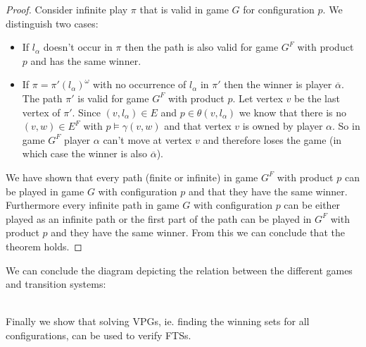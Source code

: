 \begin{theorem}
\begin{proof}
		Consider infinite play $\pi$ that is valid in game $G$ for configuration $p$. We distinguish two cases:
		\begin{itemize}
			\item If $l_\alpha$ doesn't occur in $\pi$ then the path is also valid for game $G^F$ with product $p$ and has the same winner.
			\item If $\pi = \pi'(l_\alpha)^\omega$ with no occurrence of $l_\alpha$ in $\pi'$ then the winner is player $\overline{\alpha}$. The path $\pi'$ is valid for game $G^F$ with product $p$. Let vertex $v$ be the last vertex of $\pi'$. Since $(v, l_\alpha) \in E$ and $p \in \theta(v,l_\alpha)$ we know that there is no $(v,w) \in E^F$ with $p \models \gamma(v,w)$ and that vertex $v$ is owned by player $\alpha$. So in game $G^F$ player $\alpha$ can't move at vertex $v$ and therefore loses the game (in which case the winner is also $\overline{\alpha}$).
		\end{itemize}
		
		We have shown that every path (finite or infinite) in game $G^F$ with product $p$ can be played in game $G$ with configuration $p$ and that they have the same winner. Furthermore every infinite path in game $G$ with configuration $p$ can be either played as an infinite path or the first part of the path can be played in $G^F$ with product $p$ and they have the same winner. From this we can conclude that the theorem holds.
	\end{proof}
\end{theorem}
We can conclude the diagram depicting the relation between the different games and transition systems:\\
\\
Finally we show that solving VPGs, ie. finding the winning sets for all configurations, can be used to verify FTSs.
